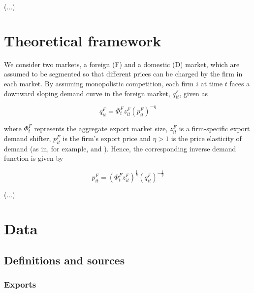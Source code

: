 \documentclass[a4paper,12pt]{article}
\begin{document}
	\vspace{0.5cm}
	(...)
	\vspace{0.5cm}



\section{Theoretical framework}\label{sec:model}

We consider two markets, a foreign
(F) and a domestic (D) market, which are assumed to be segmented so that
different prices can be charged by the firm in each market. By assuming
monopolistic competition, each firm $i$ at time $t$ faces a downward sloping demand curve in the foreign market, $q_{it}^{F}$, given as

\bigskip
\begin{equation}
q_{it}^{F}=\Phi _{t}^{F}z_{it}^{F}\left( p_{it}^{F}\right) ^{-\eta }
\label{qF demand}
\end{equation}%
\bigskip

\noindent where $\Phi _{t}^{F}$ represents the aggregate export market size, $%
z_{it}^{F}$ is a firm-specific export demand shifter, $p_{it}^{F}$ is the
firm's export price and $\eta >1$ is the price elasticity of demand (as in,
for example, \citealp{aw2011r} and \citealp{vannoorenberghe2012firm}). Hence, the corresponding inverse
demand function is given by

\bigskip
\begin{equation}
p_{it}^{F}=\left( \Phi _{t}^{F}z_{it}^{F}\right) ^{\frac{1}{\eta }}\left(
q_{it}^{F}\right) ^{-\frac{1}{\eta }}  \label{pF demand}
\end{equation}%
\bigskip

	\vspace{0.5cm}
	(...)
	\vspace{0.5cm}



\section{Data}\label{sec:data}

\subsection{Definitions and sources}

\subsubsection*{Exports}
\end{document}
